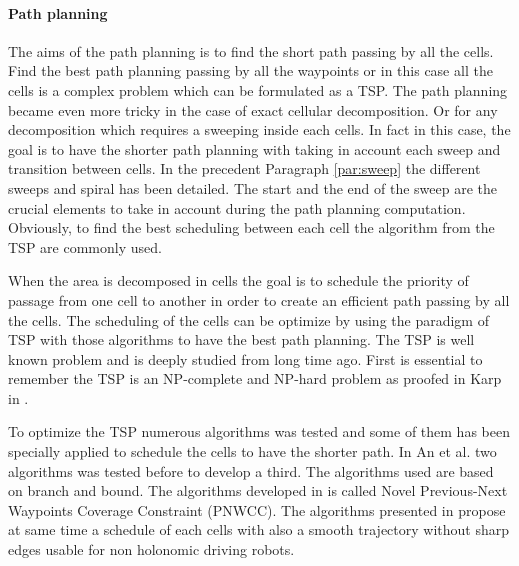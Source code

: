 	
    
 

 
 \paragraph*{Path planning} \label{par:TSPPathPlan}
 
The aims of the path planning is to find the short path passing by all the cells. Find the best path planning passing by all the waypoints or in this case all the cells is a complex problem  which can be formulated as a TSP. The path planning became even more tricky in the case of exact cellular decomposition. Or for any decomposition which requires a sweeping inside each cells. In fact in this case, the goal is to have the shorter path planning with taking in account each sweep and transition between cells. In the precedent Paragraph \ref{par:sweep} the different sweeps and spiral has been detailed. The start and the end of the sweep are the crucial elements to take in account  during the path planning computation.
 Obviously, to find the best scheduling between each cell the algorithm from the TSP are commonly used.     
 
 When the area is decomposed in cells the goal is to schedule the priority of passage from one cell to another in order to create an efficient path passing by all the cells. The scheduling of the cells can be optimize by using the paradigm of TSP with those algorithms to have the best path planning. 
The TSP is well known problem and is deeply studied from long time ago. First is essential  to remember the TSP is an NP-complete and NP-hard problem as proofed in Karp in \cite{236*karp1972}. 

To optimize the TSP numerous algorithms was tested and some of them has been specially applied to schedule the cells to have the shorter path. In  An et al. \cite{60*an2013} two algorithms was tested before to develop a third. The algorithms used are based on branch and bound. The algorithms developed in \cite{60*an2013} is called Novel Previous-Next Waypoints Coverage Constraint (PNWCC). The algorithms presented in \cite{60*an2013} propose at same time a schedule of each cells with also a smooth trajectory without sharp edges usable for non holonomic driving robots. 


